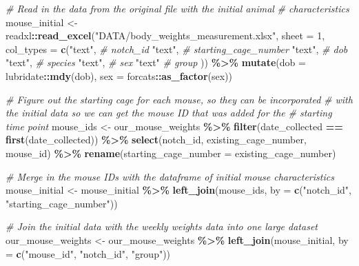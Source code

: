 \documentclass[
]{book}
\newenvironment{Shaded}{\begin{snugshade}}{\end{snugshade}}
\newcommand{\AttributeTok}[1]{\textcolor[rgb]{0.13,0.29,0.53}{#1}}
\newcommand{\CommentTok}[1]{\textcolor[rgb]{0.56,0.35,0.01}{\textit{#1}}}
\newcommand{\DecValTok}[1]{\textcolor[rgb]{0.00,0.00,0.81}{#1}}
\newcommand{\FunctionTok}[1]{\textcolor[rgb]{0.13,0.29,0.53}{\textbf{#1}}}
\newcommand{\NormalTok}[1]{#1}
\newcommand{\OtherTok}[1]{\textcolor[rgb]{0.56,0.35,0.01}{#1}}
\newcommand{\SpecialCharTok}[1]{\textcolor[rgb]{0.81,0.36,0.00}{\textbf{#1}}}
\newcommand{\StringTok}[1]{\textcolor[rgb]{0.31,0.60,0.02}{#1}}
\begin{document}
\begin{Shaded}
\begin{Highlighting}[]
\CommentTok{\# Read in the data from the original file with the initial animal }
\CommentTok{\# characteristics}
\NormalTok{mouse\_initial }\OtherTok{\textless{}{-}}\NormalTok{ readxl}\SpecialCharTok{::}\FunctionTok{read\_excel}\NormalTok{(}\StringTok{"DATA/body\_weights\_measurement.xlsx"}\NormalTok{, }
                                      \AttributeTok{sheet =} \DecValTok{1}\NormalTok{, }
                                      \AttributeTok{col\_types =} \FunctionTok{c}\NormalTok{(}\StringTok{"text"}\NormalTok{, }\CommentTok{\# notch\_id}
                                                    \StringTok{"text"}\NormalTok{, }\CommentTok{\# starting\_cage\_number}
                                                    \StringTok{"text"}\NormalTok{, }\CommentTok{\# dob}
                                                    \StringTok{"text"}\NormalTok{, }\CommentTok{\# species}
                                                    \StringTok{"text"}\NormalTok{, }\CommentTok{\# sex}
                                                    \StringTok{"text"} \CommentTok{\# group}
\NormalTok{                                                    )) }\SpecialCharTok{\%\textgreater{}\%}
  \FunctionTok{mutate}\NormalTok{(}\AttributeTok{dob =}\NormalTok{ lubridate}\SpecialCharTok{::}\FunctionTok{mdy}\NormalTok{(dob), }
         \AttributeTok{sex =}\NormalTok{ forcats}\SpecialCharTok{::}\FunctionTok{as\_factor}\NormalTok{(sex))}

\CommentTok{\# Figure out the starting cage for each mouse, so they can be incorporated}
\CommentTok{\# with the initial data so we can get the mouse ID that was added for the }
\CommentTok{\# starting time point}
\NormalTok{mouse\_ids }\OtherTok{\textless{}{-}}\NormalTok{ our\_mouse\_weights }\SpecialCharTok{\%\textgreater{}\%} 
  \FunctionTok{filter}\NormalTok{(date\_collected }\SpecialCharTok{==} \FunctionTok{first}\NormalTok{(date\_collected)) }\SpecialCharTok{\%\textgreater{}\%} 
  \FunctionTok{select}\NormalTok{(notch\_id, existing\_cage\_number, mouse\_id) }\SpecialCharTok{\%\textgreater{}\%} 
  \FunctionTok{rename}\NormalTok{(}\AttributeTok{starting\_cage\_number =}\NormalTok{ existing\_cage\_number)}

\CommentTok{\# Merge in the mouse IDs with the dataframe of initial mouse characteristics}
\NormalTok{mouse\_initial }\OtherTok{\textless{}{-}}\NormalTok{ mouse\_initial }\SpecialCharTok{\%\textgreater{}\%} 
  \FunctionTok{left\_join}\NormalTok{(mouse\_ids, }\AttributeTok{by =} \FunctionTok{c}\NormalTok{(}\StringTok{"notch\_id"}\NormalTok{, }\StringTok{"starting\_cage\_number"}\NormalTok{))}

\CommentTok{\# Join the initial data with the weekly weights data into one large dataset}
\NormalTok{our\_mouse\_weights }\OtherTok{\textless{}{-}}\NormalTok{ our\_mouse\_weights }\SpecialCharTok{\%\textgreater{}\%} 
  \FunctionTok{left\_join}\NormalTok{(mouse\_initial, }\AttributeTok{by =} \FunctionTok{c}\NormalTok{(}\StringTok{"mouse\_id"}\NormalTok{, }\StringTok{"notch\_id"}\NormalTok{, }\StringTok{"group"}\NormalTok{))}
\end{Highlighting}
\end{Shaded}
\end{document}
